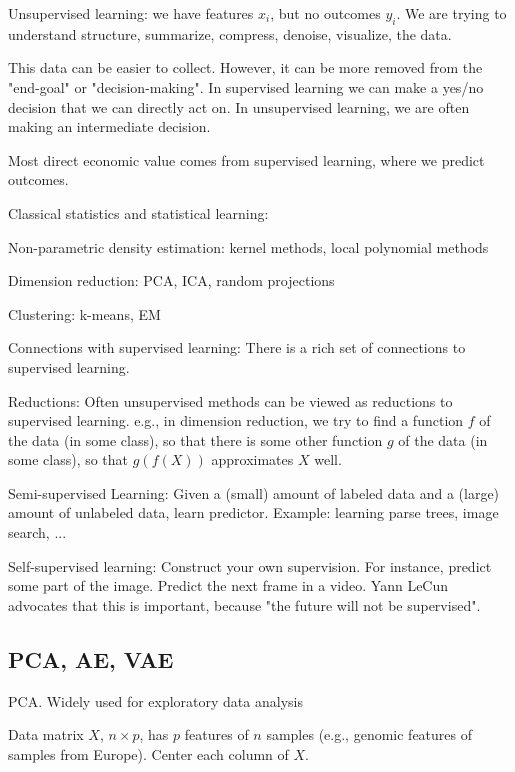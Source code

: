 \documentclass[english]{article}
\begin{document}
\benum
\item Unsupervised learning: we have features $x_i$, but no outcomes $y_i$. We are trying to understand structure, summarize, compress, denoise, visualize, the data.

This data can be easier to collect. However, it can be more removed from the "end-goal" or "decision-making". In supervised learning we can make a yes/no decision that we can directly act on. In unsupervised learning, we are often making an intermediate decision. 

Most direct economic value comes from supervised learning, where we predict outcomes.


\item Classical statistics and statistical learning: 

Non-parametric density estimation: kernel methods, local polynomial methods

Dimension reduction: PCA, ICA, random projections

Clustering: k-means, EM


\item Connections with supervised learning: There is a rich set of connections to supervised learning. 

Reductions: Often unsupervised methods can be viewed as reductions to supervised learning. e.g., in dimension reduction, we try to find a function $f$ of the data (in some class), so that there is some other function $g$ of the data (in some class), so that $g(f(X))$ approximates $X$ well. 

Semi-supervised Learning: Given a (small) amount of labeled data and a (large) amount of unlabeled data, learn predictor. Example: learning parse trees, image search, ...

Self-supervised learning: Construct your own supervision. For instance, predict some part of the image. Predict the next frame in a video. Yann LeCun advocates that this is important, because "the future will not be supervised".

\eenum 

\subsection{PCA, AE, VAE}


\benum
\item PCA. Widely used for exploratory data analysis


Data matrix $X$, $n \times p$, has $p$ features of $n$ samples (e.g., genomic features of samples from Europe). Center each column of $X$.
\end{document}
